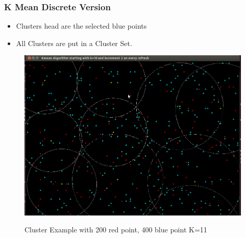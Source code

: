 \documentclass[blue]{beamer}
\begin{document}
\begin{frame}
 \frametitle{K Mean Discrete Version}
  \begin{itemize}
   \item Clusters head are the selected blue points
   \item All Clusters are put in a Cluster Set.
  \end{itemize}
   \begin{figure}[H]
     \caption{Cluster Example with 200 red point, 400 blue point K=11 }
        \centering
           \scalebox{0.4}
          {\includegraphics[width=\linewidth, height=3.4 in]{cover4.png}}
     \end{figure}
  \end{frame}
\end{document}
